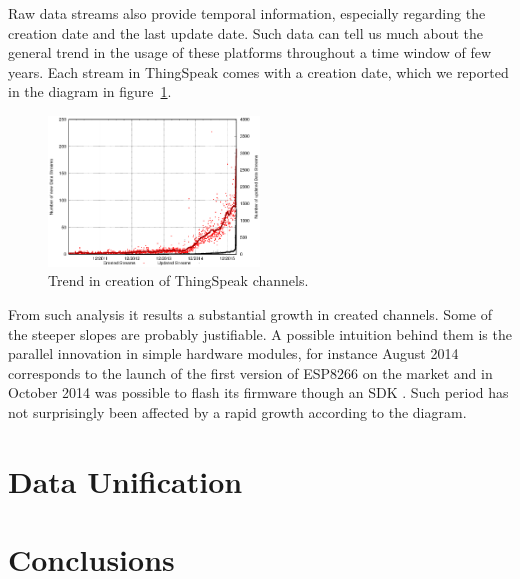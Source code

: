 \documentclass[conference]{IEEEtran}
\begin{document}
Raw data streams also provide temporal information, especially regarding the creation date and the last update date.
Such data can tell us much about the general trend in the usage of these platforms throughout a time window of few years.
Each stream in ThingSpeak comes with a creation date, which we reported in the diagram in figure~\ref{creationtrend}.
\begin{figure}[!t]
\centering
\includegraphics[width=0.50\textwidth]{img/bars.eps} 
\caption{Trend in creation of ThingSpeak channels.}
\label{creationtrend}
\end{figure}
From such analysis it results a substantial growth in created channels.
Some of the steeper slopes are probably justifiable.
A possible intuition behind them is the parallel innovation in simple hardware modules, for instance August 2014 corresponds to the launch of the first version of ESP8266 on the market and in October 2014 was possible to flash its firmware though an SDK \cite{espressif}.
Such period has not surprisingly been affected by a rapid growth according to the diagram.



\section{Data Unification}
\label{unification}

\section{Conclusions}







\end{document}
